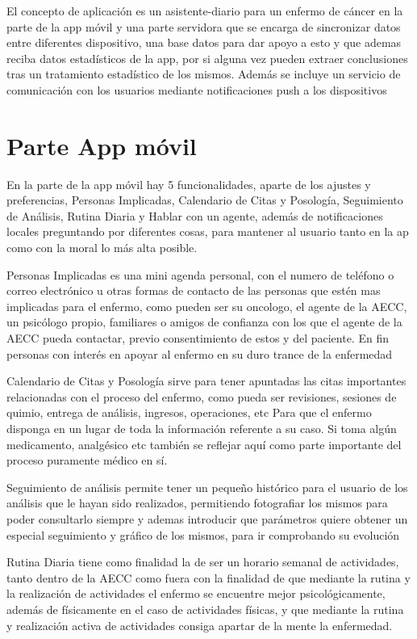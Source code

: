 \documentclass[../pfc.tex]{subfiles}
\begin{document}
	
	El concepto de aplicación es un asistente-diario para un enfermo de cáncer en la parte de la app móvil y una parte servidora que se encarga de sincronizar datos entre diferentes dispositivo, una base datos para dar apoyo a esto y que ademas reciba datos estadísticos de la app, por si alguna vez pueden extraer conclusiones tras un tratamiento estadístico de los mismos. Además se incluye un servicio de comunicación con los usuarios mediante notificaciones push a los dispositivos
	
	\section{Parte App móvil}
	
	En la parte de la app móvil hay 5 funcionalidades, aparte de los ajustes y preferencias, Personas Implicadas, Calendario de Citas y Posología, Seguimiento de Análisis, Rutina Diaria y Hablar con un agente, además de notificaciones locales preguntando por diferentes cosas, para mantener al usuario tanto en la ap como con la moral lo más alta posible.
	
	Personas Implicadas es una mini agenda personal, con el numero de teléfono o correo electrónico u otras formas de contacto de las personas que estén mas implicadas para el enfermo, como pueden ser su oncologo, el agente de la AECC, un psicólogo propio, familiares o amigos de confianza con los que el agente de la AECC pueda contactar, previo consentimiento de estos y del paciente. En fin personas con interés en apoyar al enfermo en su duro trance de la enfermedad
	
	Calendario de Citas y Posología sirve para tener apuntadas las citas importantes relacionadas con el proceso del enfermo, como pueda ser revisiones, sesiones de quimio, entrega de análisis, ingresos, operaciones, etc Para que el enfermo disponga en un lugar de toda la información referente a su caso. Si toma algún medicamento, analgésico etc también se reflejar aquí como parte importante del proceso puramente médico en sí.
	
	Seguimiento de análisis permite tener un pequeño histórico para el usuario de los análisis que le hayan sido realizados, permitiendo fotografiar los mismos para poder consultarlo siempre y ademas introducir que parámetros quiere obtener un especial seguimiento y gráfico de los mismos, para ir comprobando su evolución 
	
	Rutina Diaria tiene como finalidad la de ser un horario semanal de actividades, tanto dentro de la AECC como fuera con la finalidad de que mediante la rutina y la realización de actividades el enfermo se encuentre mejor psicológicamente, además de físicamente en el caso de actividades físicas, y que mediante la rutina y realización activa de actividades consiga apartar de la mente la enfermedad.
	
\end{document}
